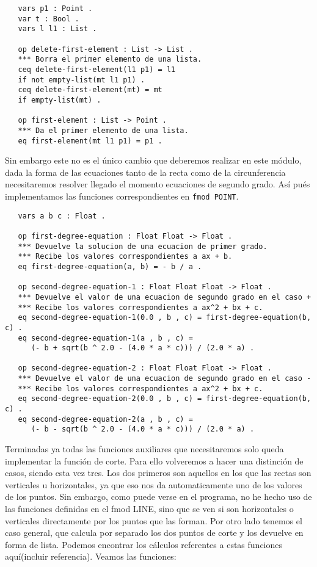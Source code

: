 {\codesize
\begin{verbatim}
   vars p1 : Point .
   var t : Bool .
   vars l l1 : List .

   op delete-first-element : List -> List .
   *** Borra el primer elemento de una lista.
   ceq delete-first-element(l1 p1) = l1
   if not empty-list(mt l1 p1) .
   ceq delete-first-element(mt) = mt
   if empty-list(mt) .

   op first-element : List -> Point .
   *** Da el primer elemento de una lista.
   eq first-element(mt l1 p1) = p1 .
\end{verbatim}

Sin embargo este no es el único cambio que deberemos realizar en este módulo, dada la forma de las ecuaciones tanto de la recta como de la circunferencia necesitaremos resolver llegado el momento ecuaciones de segundo grado. Así pués implementamos las funciones correspondientes en \texttt{fmod POINT}. \par

{\codesize
\begin{verbatim}
   vars a b c : Float .

   op first-degree-equation : Float Float -> Float .
   *** Devuelve la solucion de una ecuacion de primer grado.
   *** Recibe los valores correspondientes a ax + b.
   eq first-degree-equation(a, b) = - b / a .

   op second-degree-equation-1 : Float Float Float -> Float .
   *** Devuelve el valor de una ecuacion de segundo grado en el caso +
   *** Recibe los valores correspondientes a ax^2 + bx + c.
   eq second-degree-equation-1(0.0 , b , c) = first-degree-equation(b, c) .
   eq second-degree-equation-1(a , b , c) = 
      (- b + sqrt(b ^ 2.0 - (4.0 * a * c))) / (2.0 * a) . 

   op second-degree-equation-2 : Float Float Float -> Float .
   *** Devuelve el valor de una ecuacion de segundo grado en el caso -
   *** Recibe los valores correspondientes a ax^2 + bx + c.
   eq second-degree-equation-2(0.0 , b , c) = first-degree-equation(b, c) .
   eq second-degree-equation-2(a , b , c) = 
      (- b - sqrt(b ^ 2.0 - (4.0 * a * c))) / (2.0 * a) .
\end{verbatim}
}

Terminadas ya todas las funciones auxiliares que necesitaremos solo queda implementar la función de corte. Para ello volveremos a hacer una distinción de casos, siendo esta vez tres. Los dos primeros son aquellos en los que las rectas son verticales u horizontales, ya que eso nos da automaticamente uno de los valores de los puntos. Sin embargo, como puede verse en el programa, no he hecho uso de las funciones definidas en el fmod LINE, sino que se ven si son horizontales o verticales directamente por los puntos que las forman. Por otro lado tenemos el caso general, que calcula por separado los dos puntos de corte y los devuelve en forma de lista. Podemos encontrar los cálculos referentes a estas funciones aquí(incluir referencia). Veamos las funciones:

}
